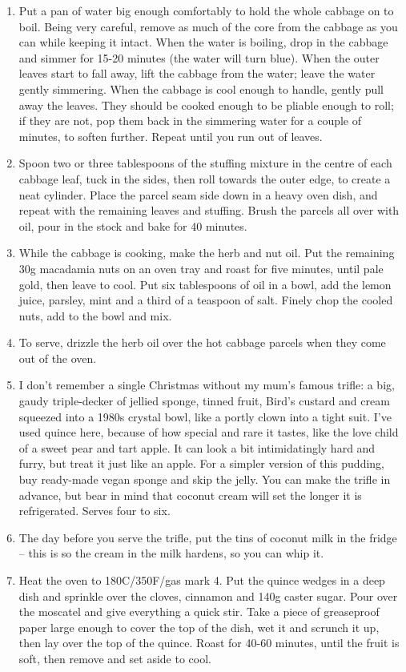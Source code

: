 \documentclass{book}
\begin{document}
\begin{enumerate}
\item Put a pan of water big enough comfortably to hold the whole cabbage on to boil. Being very careful, remove as much of the core from the cabbage as you can while keeping it intact. When the water is boiling, drop in the cabbage and simmer for 15-20 minutes (the water will turn blue). When the outer leaves start to fall away, lift the cabbage from the water; leave the water gently simmering. When the cabbage is cool enough to handle, gently pull away the leaves. They should be cooked enough to be pliable enough to roll; if they are not, pop them back in the simmering water for a couple of minutes, to soften further. Repeat until you run out of leaves.
\item Spoon two or three tablespoons of the stuffing mixture in the centre of each cabbage leaf, tuck in the sides, then roll towards the outer edge, to create a neat cylinder. Place the parcel seam side down in a heavy oven dish, and repeat with the remaining leaves and stuffing. Brush the parcels all over with oil, pour in the stock and bake for 40 minutes.
\item While the cabbage is cooking, make the herb and nut oil. Put the remaining 30g macadamia nuts on an oven tray and roast for five minutes, until pale gold, then leave to cool. Put six tablespoons of oil in a bowl, add the lemon juice, parsley, mint and a third of a teaspoon of salt. Finely chop the cooled nuts, add to the bowl and mix.
\item To serve, drizzle the herb oil over the hot cabbage parcels when they come out of the oven.
\item I don’t remember a single Christmas without my mum’s famous trifle: a big, gaudy triple-decker of jellied sponge, tinned fruit, Bird’s custard and cream squeezed into a 1980s crystal bowl, like a portly clown into a tight suit. I’ve used quince here, because of how special and rare it tastes, like the love child of a sweet pear and tart apple. It can look a bit intimidatingly hard and furry, but treat it just like an apple. For a simpler version of this pudding, buy ready-made vegan sponge and skip the jelly. You can make the trifle in advance, but bear in mind that coconut cream will set the longer it is refrigerated. Serves four to six.
\item The day before you serve the trifle, put the tins of coconut milk in the fridge – this is so the cream in the milk hardens, so you can whip it.
\item Heat the oven to 180C/350F/gas mark 4. Put the quince wedges in a deep dish and sprinkle over the cloves, cinnamon and 140g caster sugar. Pour over the moscatel and give everything a quick stir. Take a piece of greaseproof paper large enough to cover the top of the dish, wet it and scrunch it up, then lay over the top of the quince. Roast for 40-60 minutes, until the fruit is soft, then remove and set aside to cool.

\end{enumerate}
\end{document}
